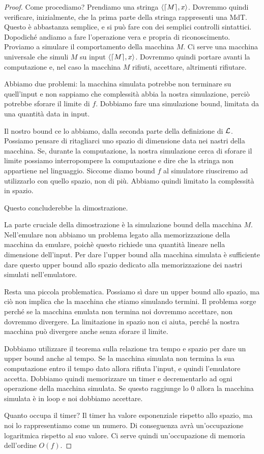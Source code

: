 \begin{proof}
    Come procediamo? Prendiamo una stringa $\langle \lceil M \rceil, x \rangle$. Dovremmo quindi verificare,
    inizialmente, che la prima parte della stringa rappresenti una MdT. Questo è abbastanza
    semplice, e si può fare con dei semplici controlli sintattici. Dopodiché andiamo a fare
    l'operazione vera e propria di riconoscimento. Proviamo a simulare il comportamento della
    macchina $M$. Ci serve una macchina universale che simuli $M$ su input $\langle \lceil M \rceil, x \rangle$.
    Dovremmo quindi portare avanti la computazione e, nel caso la macchina $M$ rifiuti, accettare,
    altrimenti rifiutare.

    Abbiamo due problemi: la macchina simulata potrebbe non terminare su quell'input e non sappiamo
    che complessità abbia la nostra simulazione, perciò potrebbe sforare il limite di $f$.
    Dobbiamo fare una simulazione bound, limitata da una quantità data in input. 

    Il nostro bound ce lo abbiamo, dalla seconda parte della definizione di $\mathcal{L}$. Possiamo
    pensare di ritagliarci uno spazio di dimensione data nei nastri della macchina. Se, durante la
    computazione, la nostra simulazione cerca di sforare il limite possiamo interropompere la
    computazione e dire che la stringa non appartiene nel linguaggio. Siccome diamo bound $f$ al
    simulatore riusciremo ad utilizzarlo con quello spazio, non di più. Abbiamo quindi limitato la
    complessità in spazio.

    Questo concluderebbe la dimostrazione.

    La parte cruciale della dimostrazione è la simulazione bound della macchina $M$. Nell'emulare
    non abbiamo un problema legato alla memorizzazione della macchina da emulare, poichè questo
    richiede una quantità lineare nella dimensione dell'input. Per dare l'upper bound alla macchina
    simulata è sufficiente dare questo upper bound allo spazio dedicato alla memorizzazione dei
    nastri simulati nell'emulatore.

    Resta una piccola problematica. Possiamo sì dare un upper bound allo spazio, ma ciò non
    implica che la macchina che stiamo simulando termini. Il problema sorge perché se la macchina
    emulata non termina noi dovremmo accettare, non dovremmo divergere. La limitazione in spazio non
    ci aiuta, perché la nostra macchina può divergere anche senza sforare il limite.

    Dobbiamo utilizzare il teorema sulla relazione tra tempo e spazio per dare un upper bound anche
    al tempo. Se la macchina simulata non termina la sua computazione entro il tempo dato allora
    rifiuta l'input, e quindi l'emulatore accetta. Dobbiamo quindi memorizzare un timer e
    decrementarlo ad ogni operazione della macchina simulata. Se questo raggiunge lo 0 allora la
    macchina simulata è in loop e noi dobbiamo accettare.

    Quanto occupa il timer? Il timer ha valore esponenziale rispetto allo spazio, ma noi lo
    rappresentiamo come un numero. Di conseguenza avrà un'occupazione logaritmica rispetto al suo
    valore. Ci serve quindi un'occupazione di memoria dell'ordine $O(f)$. 
\end{proof}

